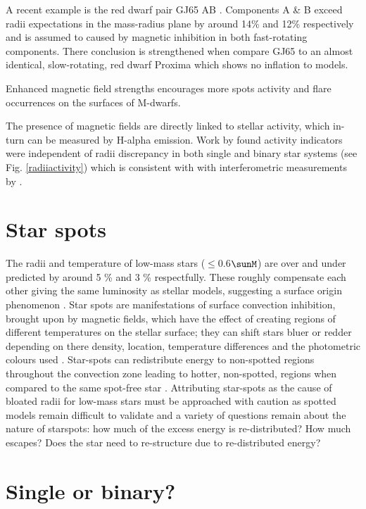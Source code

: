 A recent example is the red dwarf pair GJ65 AB \cite{Kervella2016}. Components A \& B exceed radii expectations in the mass-radius plane by around 14\% and 12\% respectively and is assumed to caused by magnetic inhibition in both fast-rotating components. There conclusion is strengthened when \cite{Kervella2016} compare GJ65 to an almost identical, slow-rotating, red dwarf Proxima which shows no inflation to models. 

Enhanced magnetic field strengths encourages more spots activity and flare occurrences on the surfaces of M-dwarfs. 

The presence of magnetic fields are directly linked to stellar activity, which in-turn can be measured by H-alpha emission. Work by \cite{Spada2013} found activity indicators were independent of radii discrepancy in both single and binary star systems (see Fig. \ref{radiiactivity}) which is consistent with with interferometric measurements by \cite{Boyajian2012}.

\section{Star spots}

The radii and temperature of low-mass stars ($\leq$0.6$\sunM$) are over and under predicted by around 5 \% and 3 \% respectfully. These roughly compensate each other giving the same luminosity as stellar models, suggesting a surface origin phenomenon \cite{Spada2013}. Star spots are manifestations of surface convection inhibition, brought upon by magnetic fields, which have the effect of creating regions of different temperatures on the stellar surface; they can shift stars bluer or redder depending on there density, location, temperature differences and the photometric colours used \cite{Feiden2013}. Star-spots can redistribute energy to non-spotted regions throughout the convection zone leading to hotter, non-spotted,  regions when compared to the same spot-free star \cite{Jackson2014}. Attributing star-spots as the cause of bloated radii for low-mass stars must be approached with caution as spotted models remain difficult to validate and a variety of questions remain about the nature of starspots: how much of the excess energy is re-distributed? How much escapes? Does the star need to re-structure due to re-distributed energy? 

\section{Single or binary?}

